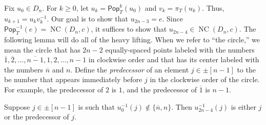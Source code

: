 \documentclass[ALCO,ThmDefs,Unicode,epreuves]{cedram}
\newcommand{\darkblue}{\color{darkblue}}
\newcommand{\defn}[1]{\emph{\darkblue #1}}
\newcommand{\pop}{\mathsf{Pop}}
\DeclareMathOperator{\NC}{NC}
\begin{document}
Fix $u_0\in D_n$. For $k\geq 0$, let $u_k=\pop_T^k(u_0)$ and $v_k=\pi_T(u_k)$. Thus, $u_{k+1}=u_kv_k^{-1}$. Our goal is to show that $u_{2n-3}=e$. Since $\pop_T^{-1}(e)=\NC(D_n,c)$, it suffices to show that $u_{2n-4}\in\NC(D_n,c)$. The following lemma will do all of the heavy lifting. When we refer to ``the circle,'' we mean the circle that has $2n{-}2$ equally-spaced points labeled with the numbers $\overline 1,\overline 2,\ldots,\overline{n-1},1,2,\ldots,n-1$ in clockwise order and that has its center labeled with the numbers $\overline n$ and $n$. Define the \defn{predecessor} of an element $j\in\pm[n-1]$ to the be number that appears immediately before $j$ in the clockwise order of the circle. For example, the predecessor of $2$ is $1$, and the predecessor of $\overline 1$ is $n-1$.  

\begin{lemma}\label{lem:DMainLemma}
Suppose $j\in\pm[n-1]$ is such that $u_0^{-1}(j)\not\in\{\overline n,n\}$. Then $u_{2n-4}^{-1}(j)$ is either $j$ or the predecessor of $j$. 
\end{lemma}
\end{document}
